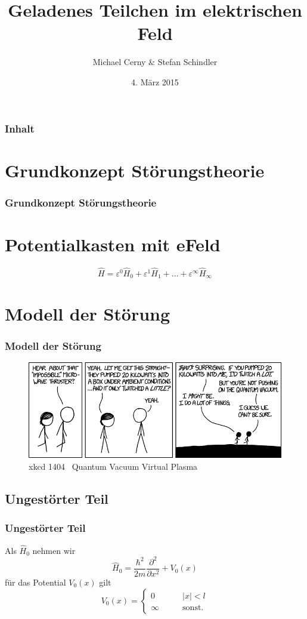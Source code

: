 \documentclass[aspectratio=169]{beamer}
\title{ Geladenes Teilchen im elektrischen Feld }
\author{ Michael Cerny \& Stefan Schindler }
\date{ 4. M\"arz 2015 }
\begin{document}
\begin{frame}
  \titlepage
\end{frame}

\begin{frame}
  \frametitle{ Inhalt }
  \tableofcontents
\end{frame}

\section{ Grundkonzept St\"orungstheorie } 
\begin{frame}\frametitle{ Grundkonzept St\"orungstheorie } 
  \section{ Potentialkasten mit eFeld }
  \[
  \hat{H} = \varepsilon^0 \hat H_0 + \varepsilon^1 \hat H_1 + \ldots + \varepsilon^\infty \hat H_\infty
  \]
\end{frame}

\section{ Modell der St\"orung }
\begin{frame}
  \frametitle{ Modell der St\"orung }
  \begin{figure}
    \centering
    \includegraphics[width=14cm]{./1404_quantum_vacuum_virtual_plasma.png}
    \caption{xkcd 1404 \textendash \ Quantum Vacuum Virtual Plasma}
  \end{figure}

\end{frame}


\subsection{ Ungest\"orter Teil }
\begin{frame}
  \frametitle{ Ungest\"orter Teil }
  Als $\hat H_0$ nehmen wir
  \[
    \hat H_0 = \frac{\hbar^2}{2m} \frac{\partial^2}{\partial x^2} + V_0(x)
  \]
  f\"ur das Potential $V_0(x)$ gilt
  \[
    V_0(x)=\begin{cases}
      0       & \qquad |x|<l\\
      \infty  & \qquad\text{sonst.}
    \end{cases}
  \]
\end{frame}
\end{document}
